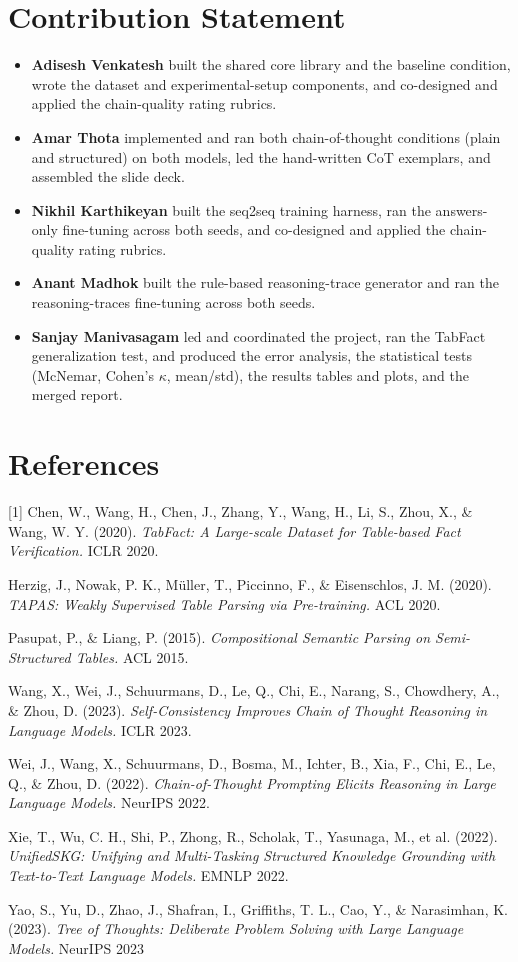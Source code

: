 \documentclass[sigconf]{acmart}
\begin{document}
\section*{Contribution Statement}
\begin{itemize}
  \item \textbf{Adisesh Venkatesh} built the shared core library and the baseline condition, wrote the dataset and experimental-setup components, and co-designed and applied the chain-quality rating rubrics.
  \item \textbf{Amar Thota} implemented and ran both chain-of-thought conditions (plain and structured) on both models, led the hand-written CoT exemplars, and assembled the slide deck.
  \item \textbf{Nikhil Karthikeyan} built the seq2seq training harness, ran the answers-only fine-tuning across both seeds, and co-designed and applied the chain-quality rating rubrics.
  \item \textbf{Anant Madhok} built the rule-based reasoning-trace generator and ran the reasoning-traces fine-tuning across both seeds.
  \item \textbf{Sanjay Manivasagam} led and coordinated the project, ran the TabFact generalization test, and produced the error analysis, the statistical tests (McNemar, Cohen's $\kappa$, mean/std), the results tables and plots, and the merged report.
\end{itemize}

\section*{References}
\begingroup
\small
\setlength{\parindent}{-1.2em}
\setlength{\leftskip}{1.2em}
\setlength{\parskip}{2pt}
[1] Chen, W., Wang, H., Chen, J., Zhang, Y., Wang, H., Li, S., Zhou, X., \& Wang, W. Y. (2020). \textit{TabFact: A Large-scale Dataset for Table-based Fact Verification.} ICLR 2020.\par
[2] Herzig, J., Nowak, P. K., M\"uller, T., Piccinno, F., \& Eisenschlos, J. M. (2020). \textit{TAPAS: Weakly Supervised Table Parsing via Pre-training.} ACL 2020.\par
[3] Pasupat, P., \& Liang, P. (2015). \textit{Compositional Semantic Parsing on Semi-Structured Tables.} ACL 2015.\par
[4] Wang, X., Wei, J., Schuurmans, D., Le, Q., Chi, E., Narang, S., Chowdhery, A., \& Zhou, D. (2023). \textit{Self-Consistency Improves Chain of Thought Reasoning in Language Models.} ICLR 2023.\par
[5] Wei, J., Wang, X., Schuurmans, D., Bosma, M., Ichter, B., Xia, F., Chi, E., Le, Q., \& Zhou, D. (2022). \textit{Chain-of-Thought Prompting Elicits Reasoning in Large Language Models.} NeurIPS 2022.\par
[6] Xie, T., Wu, C. H., Shi, P., Zhong, R., Scholak, T., Yasunaga, M., et al. (2022). \textit{UnifiedSKG: Unifying and Multi-Tasking Structured Knowledge Grounding with Text-to-Text Language Models.} EMNLP 2022.\par
[7] Yao, S., Yu, D., Zhao, J., Shafran, I., Griffiths, T. L., Cao, Y., \& Narasimhan, K. (2023). \textit{Tree of Thoughts: Deliberate Problem Solving with Large Language Models.} NeurIPS 2023\par
\endgroup
\end{document}
